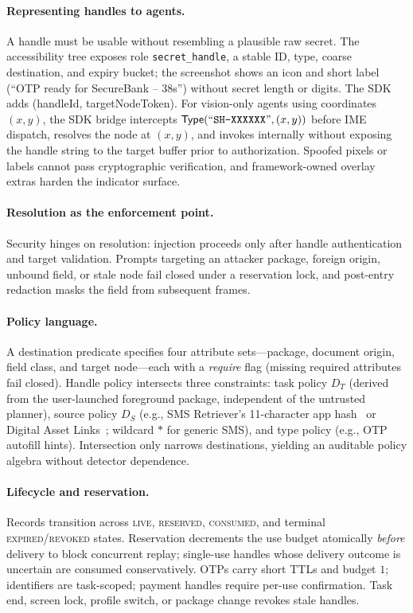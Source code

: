 \paragraph{Representing handles to agents.} A handle must be usable without resembling a plausible raw secret. The accessibility tree exposes role \texttt{secret\_handle}, a stable ID, type, coarse destination, and expiry bucket; the screenshot shows an icon and short label (``OTP ready for SecureBank -- 38s'') without secret length or digits. The SDK adds \Enter(handleId, targetNodeToken). For vision-only agents using coordinates $(x,y)$, the SDK bridge intercepts $\mathsf{Type}(\text{``\texttt{SH-XXXXXX}''}, (x,y))$ before IME dispatch, resolves the node at $(x,y)$, and invokes \Enter{} internally without exposing the handle string to the target buffer prior to authorization. Spoofed pixels or labels cannot pass cryptographic verification, and framework-owned overlay extras harden the indicator surface.

\paragraph{Resolution as the enforcement point.} Security hinges on resolution: injection proceeds only after handle authentication and target validation. Prompts targeting an attacker package, foreign origin, unbound field, or stale node fail closed under a reservation lock, and post-entry redaction masks the field from subsequent frames.

\paragraph{Policy language.} A destination predicate specifies four attribute sets---package, document origin, field class, and target node---each with a \emph{require} flag (missing required attributes fail closed). Handle policy intersects three constraints: task policy $D_T$ (derived from the user-launched foreground package, independent of the untrusted planner), source policy $D_S$ (e.g., SMS Retriever's 11-character app hash~\cite{androidSmsRetriever} or Digital Asset Links~\cite{androidCredentialManager}; wildcard $*$ for generic SMS), and type policy (e.g., OTP autofill hints). Intersection only narrows destinations, yielding an auditable policy algebra without detector dependence.

\paragraph{Lifecycle and reservation.} Records transition across \textsc{live}, \textsc{reserved}, \textsc{consumed}, and terminal \textsc{expired}/\textsc{revoked} states. Reservation decrements the use budget atomically \emph{before} delivery to block concurrent replay; single-use handles whose delivery outcome is uncertain are consumed conservatively. OTPs carry short TTLs and budget $1$; identifiers are task-scoped; payment handles require per-use confirmation. Task end, screen lock, profile switch, or package change revokes stale handles.

